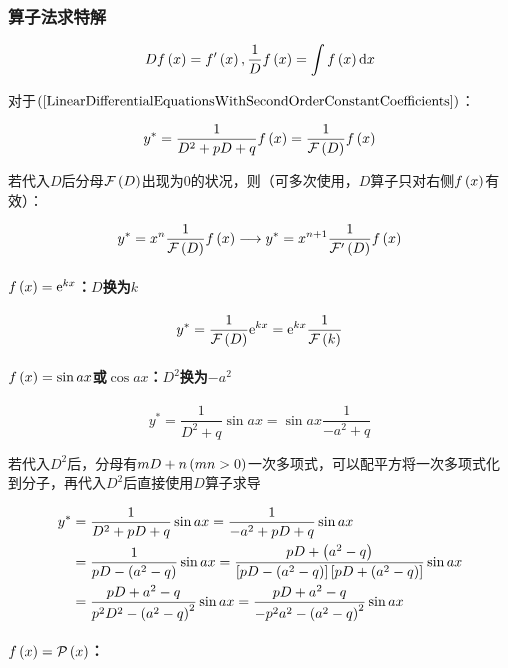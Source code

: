 \documentclass{article}
\begin{document}
\subsubsection{算子法求特解}

\begin{definition}[$D$算子]
    \[Df\left(x\right)=f^\prime\left(x\right),\frac1Df\left(x\right)=\int f\left(x\right)\mathrm d x\]
\end{definition}

对于$\left(\ref{LinearDifferentialEquationsWithSecondOrderConstantCoefficients}\right)$：

\[y^*=\frac1{D^2+pD+q}f\left(x\right)=\frac1{\mathcal F\left(D\right)}f\left(x\right)\]

若代入$D$后分母$\mathcal F\left(D\right)$出现为$0$的状况，则（可多次使用，$D$算子只对右侧$f\left(x\right)$有效）：

\[y^*=x^n\frac1{\mathcal F\left(D\right)}f\left(x\right)\longrightarrow y^*=x^{n+1}\frac1{\mathcal F^\prime\left(D\right)}f\left(x\right)\]

\paragraph{$f\left(x\right)=\mathrm e^{kx}$：$D$换为$k$}

\[y^*=\frac1{\mathcal F\left(D\right)}\mathrm e^{kx}=\mathrm e^{kx}\frac1{\mathcal F\left(k\right)}\]

\paragraph{$f\left(x\right)=\sin ax$或$\cos ax$：$D^2$换为$-a^2$}

\[y^*=\frac1{D^2+q}\sin ax=\sin ax\frac1{-a^2+q}\]

若代入$D^2$后，分母有$mD+n\left(mn>0\right)$一次多项式，可以配平方将一次多项式化到分子，再代入$D^2$后直接使用$D$算子求导

\[\begin{aligned}
        y^* & =\frac1{D^2+pD+q}\sin ax=\frac1{-a^2+pD+q}\sin ax                                           \\
            & =\frac1{pD-\left(a^2-q\right)}\sin ax=\frac{pD+\left(a^2-q\right)}{\left[pD-\left(a^2-q\right)\right]\left[pD+\left(a^2-q\right)\right]}\sin ax \\
            & =\frac{pD+a^2-q}{p^2D^2-\left(a^2-q\right)^2}\sin ax=\frac{pD+a^2-q}{-p^2a^2-\left(a^2-q\right)^2}\sin ax
    \end{aligned}\]

\paragraph{$f\left(x\right)=\mathcal P\left(x\right)$：}
\end{document}
